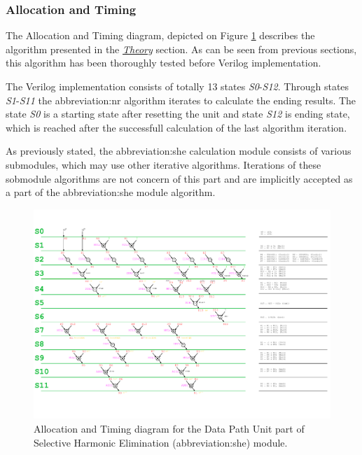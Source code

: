 \documentclass[a4paper, twoside, 11pt]{article}
\begin{document}
        \subsubsection{Allocation and Timing}\label{sh:allocation-and-timing}
            The Allocation and Timing diagram, depicted on Figure \ref{fig:she-allocation-timing} describes the algorithm presented in the \hyperref[subsec:she-theory]{\textit{Theory}} section. As can be seen from previous sections, this algorithm has been thoroughly tested before Verilog implementation.\par
            The Verilog implementation consists of totally 13 states \textit{S0}-\textit{S12}. Through states \textit{S1}-\textit{S11} the \gls{abbreviation:nr} algorithm iterates to calculate the ending results. The state \textit{S0} is a starting state after resetting the unit and state \textit{S12} is ending state, which is reached after the successfull calculation of the last algorithm iteration.\par
            As previously stated, the \gls{abbreviation:she} calculation module consists of various submodules, which may use other iterative algorithms. Iterations of these sobmodule algorithms are not concern of this part and are implicitly accepted as a part of the \gls{abbreviation:she} module algorithm.



            \begin{figure}[htbp!]
                \centering
                \includegraphics[width=1\textwidth]{src/pdf/she-allocation-timing.pdf}
                           \caption{Allocation and Timing diagram for the Data Path Unit part of Selective Harmonic Elimination (\gls{abbreviation:she}) module.}
                \label{fig:she-allocation-timing}
            \end{figure}
\end{document}
